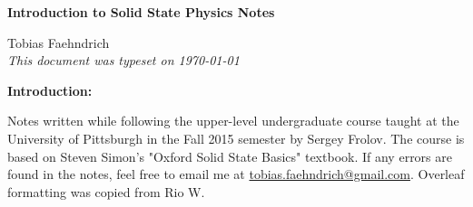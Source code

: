 \documentclass[10pt]{article}
\begin{document}
\begin{tcolorbox}
  \begin{center}
  \begin{Large}
    \textbf{Introduction to Solid State Physics Notes} \\
    \vspace{5pt}
  \end{Large}
  \begin{large}
        Tobias Faehndrich \\
\vspace{5pt}
    \emph{This document was typeset on \today}
  \end{large}
  \end{center}
\end{tcolorbox}

\begin{center}
  \textbf{Introduction:}

Notes written while following the upper-level undergraduate course taught at the University of Pittsburgh in the Fall 2015 semester by Sergey Frolov. The course is based on Steven Simon's "Oxford Solid State Basics" textbook. If any errors are found in the notes, feel free to email me at \href{mailto:tobias.faehndrich@gmail.com}{tobias.faehndrich@gmail.com}. Overleaf formatting was copied from Rio W.

\end{center}
\tableofcontents


\newpage


\newpage



\newpage



\newpage



\newpage



\newpage


\newpage


\newpage


\newpage


\newpage



\newpage


\newpage


\newpage


\newpage



\newpage


\newpage


\newpage


\newpage

\end{document}
